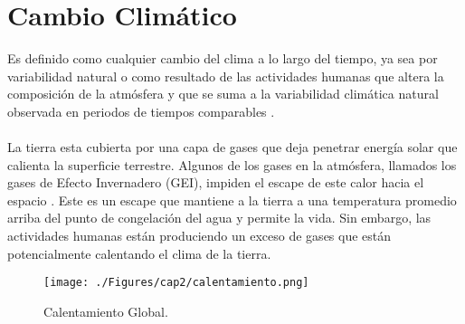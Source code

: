 \newpage{\ } 
\thispagestyle{empty} 

\chapter{Cambio Clim\'atico}

Es definido como cualquier cambio del clima a lo largo del tiempo, ya sea por variabilidad natural o como resultado de las actividades humanas que altera la composici\'on de la atm\'osfera y que se suma a la variabilidad clim\'atica natural observada en periodos de tiempos comparables \cite{robert2002captura}.\\~\\
La tierra esta cubierta por una capa de gases que deja penetrar energ\'ia solar que calienta la superficie terrestre. Algunos de los gases en la atm\'osfera, llamados los gases de Efecto Invernadero (GEI), impiden el escape de este calor hacia el espacio . Este es un escape que mantiene a la tierra a una temperatura promedio arriba del punto de congelaci\'on del agua y permite la vida. Sin embargo, las actividades humanas est\'an produciendo un exceso de gases que est\'an potencialmente calentando el clima de la tierra\cite{almando2014estimacion}.
    \begin{figure}[!hbtp]
    	\centering
    	\texttt{[image: ./Figures/cap2/calentamiento.png]}
    	\caption{Calentamiento Global.}
    	\label{fig:cambioClimatico}
    \end{figure}


